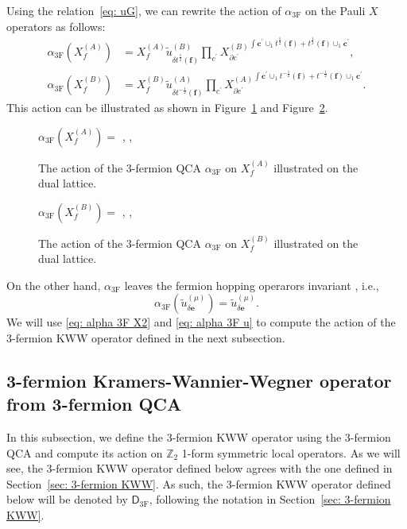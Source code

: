 \documentclass[aps,twocolumn,prx,floatfix,preprintnumbers, nofootinbib,10pt]{revtex4-2}
\numberwithin{equation}{section}
\theoremstyle{definition}
\theoremstyle{remark}
\theoremstyle{claim}
\begin{document}
Using the relation~\eqref{eq: uG}, we can rewrite the action of $\alpha_\text{3F}$ on the Pauli $X$ operators as follows:
\begin{equation}
\begin{aligned}
\alpha_\text{3F}(X_f^{(A)}) &= X_f^{(A)} \tilde{u}_{\delta t^{\frac{1}{2}}(\bm{f})}^{(B)} \left. \prod_{c^{\prime}} X_{\partial c^{\prime}}^{(B)} \right.^{\int \bm{c}^{\prime} \cup_1 t^{\frac{1}{2}}(\bm{f}) + t^{\frac{1}{2}}(\bm{f}) \cup_1 \bm{c}^{\prime}}, \\
\alpha_\text{3F}(X_f^{(B)}) &= X_f^{(B)} \tilde{u}_{\delta t^{-\frac{1}{2}}(\bm{f})}^{(A)} \left. \prod_{c^{\prime}} X_{\partial c^{\prime}}^{(A)} \right.^{\int \bm{c}^{\prime} \cup_1 t^{-\frac{1}{2}}(\bm{f}) + t^{-\frac{1}{2}}(\bm{f}) \cup_1 \bm{c}^{\prime}}.
\end{aligned}
\label{eq: alpha 3F X2}
\end{equation}
This action can be illustrated as shown in Figure~\ref{fig: alpha 3F XA} and Figure~\ref{fig: alpha 3F XB}.
\begin{figure}
\centering
$\alpha_\text{3F}(X_f^{(A)}) =$
, 
,
\caption{The action of the 3-fermion QCA $\alpha_\text{3F}$ on $X_f^{(A)}$ illustrated on the dual lattice.}
\label{fig: alpha 3F XA}
\end{figure}
\begin{figure}
\centering
$\alpha_\text{3F}(X_f^{(B)}) =$
, 
, 
\caption{The action of the 3-fermion QCA $\alpha_\text{3F}$ on $X_f^{(B)}$ illustrated on the dual lattice.}
\label{fig: alpha 3F XB}
\end{figure}
On the other hand, $\alpha_\text{3F}$ leaves the fermion hopping operarors invariant \cite{MengSun2026}, i.e.,
\begin{equation}
\alpha_\text{3F}(\tilde{u}_{\delta \bm{e}}^{(\mu)}) = \tilde{u}_{\delta \bm{e}}^{(\mu)}.
\label{eq: alpha 3F u}
\end{equation}
We will use \eqref{eq: alpha 3F X2} and \eqref{eq: alpha 3F u} to compute the action of the 3-fermion KWW operator defined in the next subsection.

\subsection{3-fermion Kramers-Wannier-Wegner operator from 3-fermion QCA}
\label{sec: 3F KWW revisited}
In this subsection, we define the 3-fermion KWW operator using the 3-fermion QCA and compute its action on $\mathbb{Z}_2$ 1-form symmetric local operators.
As we will see, the 3-fermion KWW operator defined below agrees with the one defined in Section~\ref{sec: 3-fermion KWW}.
As such, the 3-fermion KWW operator defined below will be denoted by $\mathsf{D}_\text{3F}$, following the notation in Section~\ref{sec: 3-fermion KWW}.
\end{document}
